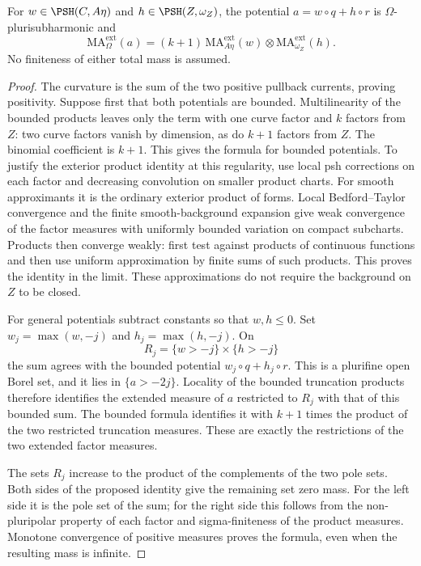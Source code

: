 \begin{proposition}\label{prop:curve-product-extended-ma}
For $w\in\PSH(C,A\eta)$ and $h\in\PSH(Z,\omega_Z)$, the potential $a=w\circ q+h\circ r$ is $\Omega$-plurisubharmonic and
\begin{equation}\label{eq:curve-product-extended-ma}
 \mathrm{MA}^{\mathrm{ext}}_\Omega(a)
 =(k+1)\,
       \mathrm{MA}^{\mathrm{ext}}_{A\eta}(w)
                \otimes\mathrm{MA}^{\mathrm{ext}}_{\omega_Z}(h).
\end{equation}
No finiteness of either total mass is assumed.
\end{proposition}
\begin{proof}
The curvature is the sum of the two positive pullback currents, proving positivity. Suppose first that both potentials are bounded. Multilinearity of the bounded products leaves only the term with one curve factor and $k$ factors from $Z$: two curve factors vanish by dimension, as do $k+1$ factors from $Z$. The binomial coefficient is $k+1$. This gives the formula for bounded potentials. To justify the exterior product identity at this regularity, use local psh corrections on each factor and decreasing convolution on smaller product charts. For smooth approximants it is the ordinary exterior product of forms. Local Bedford--Taylor convergence and the finite smooth-background expansion give weak convergence of the factor measures with uniformly bounded variation on compact subcharts. Products then converge weakly: first test against products of continuous functions and then use uniform approximation by finite sums of such products. This proves the identity in the limit. These approximations do not require the background on $Z$ to be closed.

For general potentials subtract constants so that $w,h\leq0$. Set $w_j=\max(w,-j)$ and $h_j=\max(h,-j)$. On
\[
 R_j=\{w>-j\}\times\{h>-j\}
\]
the sum agrees with the bounded potential $w_j\circ q+h_j\circ r$. This is a plurifine open Borel set, and it lies in $\{a>-2j\}$. Locality of the bounded truncation products therefore identifies the extended measure of $a$ restricted to $R_j$ with that of this bounded sum. The bounded formula identifies it with $k+1$ times the product of the two restricted truncation measures. These are exactly the restrictions of the two extended factor measures.

The sets $R_j$ increase to the product of the complements of the two pole sets. Both sides of the proposed identity give the remaining set zero mass. For the left side it is the pole set of the sum; for the right side this follows from the non-pluripolar property of each factor and sigma-finiteness of the product measures. Monotone convergence of positive measures proves the formula, even when the resulting mass is infinite.
\end{proof}

